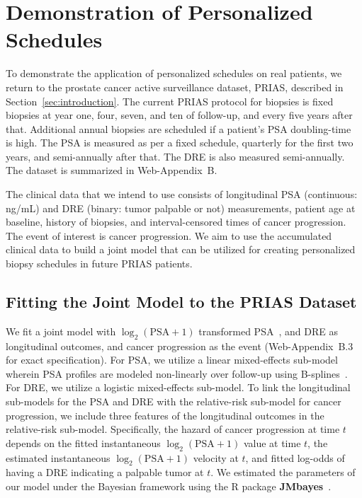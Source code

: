 \section{Demonstration of Personalized Schedules}
\label{sec:results}
To demonstrate the application of personalized schedules on real patients, we return to the prostate cancer active surveillance dataset, PRIAS, described in Section~\ref{sec:introduction}. The current PRIAS protocol for biopsies is fixed biopsies at year one, four, seven, and ten of follow-up, and every five years after that. Additional annual biopsies are scheduled if a patient's PSA doubling-time~\citep{bokhorst2015compliance} is high. The PSA is measured as per a fixed schedule, quarterly for the first two years, and semi-annually after that. The DRE is also measured semi-annually. The dataset is summarized in Web-Appendix~B.

The clinical data that we intend to use consists of longitudinal PSA (continuous: ng/mL) and DRE (binary: tumor palpable or not) measurements, patient age at baseline, history of biopsies, and interval-censored times of cancer progression. The event of interest is cancer progression. We aim to use the accumulated clinical data to build a joint model that can be utilized for creating personalized biopsy schedules in future PRIAS patients.

\subsection{Fitting the Joint Model to the PRIAS Dataset}
We fit a joint model with $\log_2(\mbox{PSA} + 1)$ transformed PSA~\citep{lin2000latent,pearson1994mixed}, and DRE as longitudinal outcomes, and cancer progression as the event (Web-Appendix~B.3 for exact specification). For PSA, we utilize a linear mixed-effects sub-model wherein PSA profiles are modeled non-linearly over follow-up using B-splines~\citep{de1978practical}. For DRE, we utilize a logistic mixed-effects sub-model. To link the longitudinal sub-models for the PSA and DRE with the relative-risk sub-model for cancer progression, we include three features of the longitudinal outcomes in the relative-risk sub-model. Specifically, the hazard of cancer progression at time $t$ depends on the fitted instantaneous $\log_2(\mbox{PSA} + 1)$ value at time $t$, the estimated instantaneous $\log_2(\mbox{PSA} + 1)$ velocity at $t$, and fitted log-odds of having a DRE indicating a palpable tumor at $t$. We estimated the parameters of our model under the Bayesian framework using the R package \textbf{JMbayes}~\citep{rizopoulosJMbayes}.  

